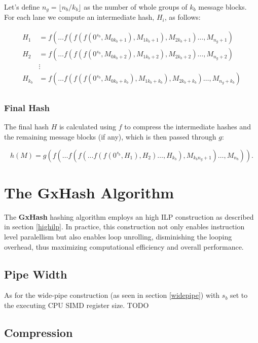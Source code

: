 \documentclass[10pt]{article}
\begin{document}
Let's define \( n_g = \lfloor {n_b}/{k_b} \rfloor \) as the number of whole groups of \( k_b \) message blocks. \\
For each lane we compute an intermediate hash, \( H_i \), as follows:

\begin{align*}
H_{1} &= f(\ldots f(f(f(0^{s_b}, M_{0k_b + 1}), M_{1k_b + 1}), M_{2k_b + 1})\ldots, M_{n_g + 1}) \\
H_{2} &= f(\ldots f(f(f(0^{s_b}, M_{0k_b + 2}), M_{1k_b + 2}), M_{2k_b + 2})\ldots, M_{n_g + 2}) \\
&\vdots \\
H_{k_b} &= f(\ldots f(f(f(0^{s_b}, M_{0k_b + k_b}), M_{1k_b + k_b}), M_{2k_b + k_b})\ldots, M_{n_g + k_b}) \\
\end{align*}

\subsubsection{Final Hash}

The final hash \( H \) is calculated using \( f \) to compress the intermediate hashes and the remaining message blocks (if any),
which is then passed through \( g \):

\begin{equation*}
h(M) = g\left( f( \ldots f(f(\ldots f(f(0^{s_b}, H_1), H_2) \ldots, H_{k_b}), M_{{k_b}{n_g}+1}) \ldots, M_{n_b} ) \right).
\end{equation*}

\section{The GxHash Algorithm}

The \textbf{GxHash} hashing algorithm employs an high ILP construction as described in section \ref{highilp}. In practice,
this construction not only enables instruction level paralellism but also enables loop unrolling, disminishing the looping overhead,
thus maximizing computational efficiency and overall performance. 

\subsection{Pipe Width}
As for the wide-pipe construction (as seen in section \ref{widepipe}) with \( s_b \) set to the executing CPU SIMD register size.
TODO

\subsection{Compression}
\end{document}
